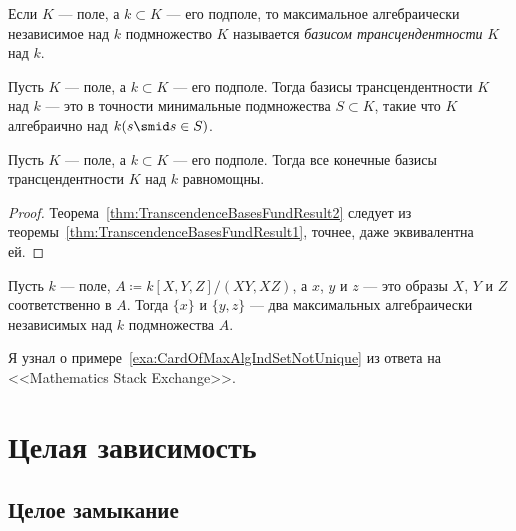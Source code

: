 \documentclass[
	extrafontsizes,
	11pt,
	hyphens,
]{memoir}
\begin{document}
\begin{definition}
Если \(K\) --- поле, а \(k \subset K\) --- его подполе,
то максимальное алгебраически независимое над \(k\) подмножество \(K\) называется \emph{базисом трансцендентности} \(K\) над \(k\).
\end{definition}

\begin{observation}
Пусть \(K\) --- поле, а \(k \subset K\) --- его подполе.
Тогда базисы трансцендентности \(K\) над \(k\) --- это в точности минимальные подмножества \(S \subset K\), такие что \(K\) алгебраично над \(k(s \smid s \in S)\).
\end{observation}

\begin{theorem}
Пусть \(K\) --- поле, а \(k \subset K\) --- его подполе.
\label{thm:TranscendenceBasesFundResult2}
Тогда все конечные базисы трансцендентности \(K\) над \(k\) равномощны.
\end{theorem}

\begin{proof}
Теорема~\ref{thm:TranscendenceBasesFundResult2} следует из теоремы~\ref{thm:TranscendenceBasesFundResult1}, точнее, даже эквивалентна ей.
\end{proof}

\begin{example}
Пусть \(k\) --- поле, \(A \coloneqq k[X, Y, Z]/(XY, XZ)\), а \(x\), \(y\) и \(z\) --- это образы \(X\), \(Y\) и \(Z\) соответственно в \(A\).%
\label{exa:CardOfMaxAlgIndSetNotUnique}
Тогда \(\{x\}\) и \(\{y, z\}\) --- два максимальных алгебраически независимых над \(k\) подмножества \(A\).
\end{example}

\begin{remark}
Я узнал о примере~\ref{exa:CardOfMaxAlgIndSetNotUnique} из ответа \cite{ms942910} на <<\textenglish{Mathematics Stack Exchange}>>.
\end{remark}



\chapter{Целая зависимость}


\section{Целое замыкание}
\end{document}
